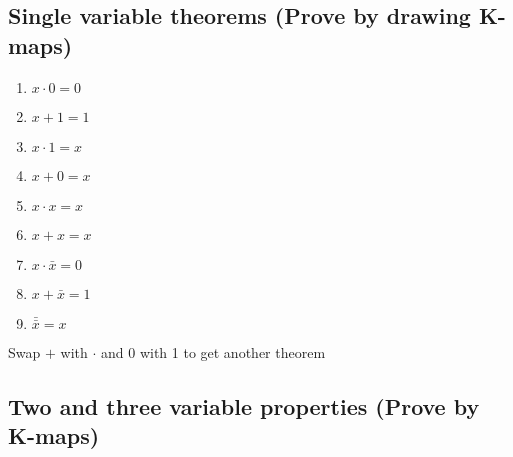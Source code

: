 \subsection{Single variable theorems (Prove by drawing K-maps)}

\begin{enumerate}
\item $ x \cdot 0 = 0 $
  \vspace{5em}
\item $ x + 1 = 1 $
  \vspace{5em}
\item $ x \cdot 1 = x $
  \vspace{5em}
\item $ x + 0 = x $
  \vspace{5em}
\item $ x \cdot x = x $
  \vspace{5em}
\item $ x + x = x $
  \vspace{5em}
\item $ x \cdot \bar{x} = 0 $
  \vspace{5em}
\item $ x + \bar{x} = 1 $
  \vspace{5em}
\item $\bar{\bar{x}} = x $
  \vspace{5em}
\end{enumerate}

\begin{remark}[Duality]
  Swap $+$ with $\cdot$ and 0 with 1 to get another theorem
\end{remark}

\subsection{Two and three variable properties (Prove by K-maps)}


